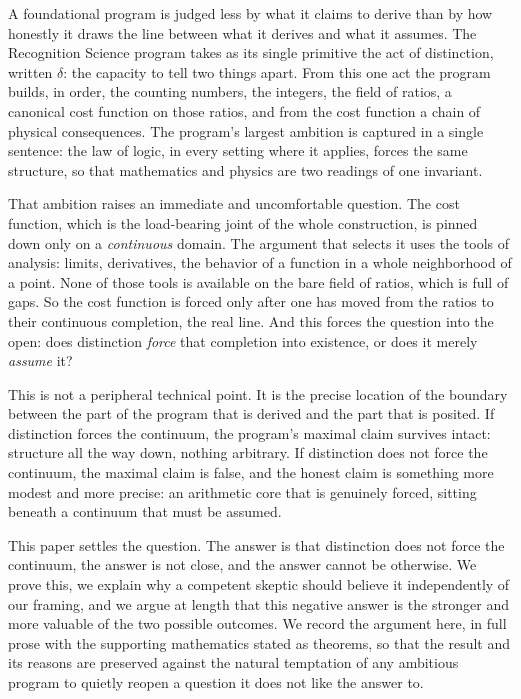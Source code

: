 \documentclass[11pt,a4paper]{article}
\theoremstyle{definition}
\theoremstyle{remark}
\begin{document}
A foundational program is judged less by what it claims to derive than by how
honestly it draws the line between what it derives and what it assumes. The
Recognition Science program takes as its single primitive the act of
distinction, written $\delta$: the capacity to tell two things apart. From this
one act the program builds, in order, the counting numbers, the integers, the
field of ratios, a canonical cost function on those ratios, and from the cost
function a chain of physical consequences. The program's largest ambition is
captured in a single sentence: the law of logic, in every setting where it
applies, forces the same structure, so that mathematics and physics are two
readings of one invariant.

That ambition raises an immediate and uncomfortable question. The cost function,
which is the load-bearing joint of the whole construction, is pinned down only
on a \emph{continuous} domain. The argument that selects it uses the tools of
analysis: limits, derivatives, the behavior of a function in a whole
neighborhood of a point. None of those tools is available on the bare field of
ratios, which is full of gaps. So the cost function is forced only after one has
moved from the ratios to their continuous completion, the real line. And this
forces the question into the open: does distinction \emph{force} that completion
into existence, or does it merely \emph{assume} it?

This is not a peripheral technical point. It is the precise location of the
boundary between the part of the program that is derived and the part that is
posited. If distinction forces the continuum, the program's maximal claim
survives intact: structure all the way down, nothing arbitrary. If distinction
does not force the continuum, the maximal claim is false, and the honest claim is
something more modest and more precise: an arithmetic core that is genuinely
forced, sitting beneath a continuum that must be assumed.

This paper settles the question. The answer is that distinction does not force
the continuum, the answer is not close, and the answer cannot be otherwise. We
prove this, we explain why a competent skeptic should believe it independently of
our framing, and we argue at length that this negative answer is the stronger and
more valuable of the two possible outcomes. We record the argument here, in full
prose with the supporting mathematics stated as theorems, so that the result and
its reasons are preserved against the natural temptation of any ambitious program
to quietly reopen a question it does not like the answer to.
\end{document}
